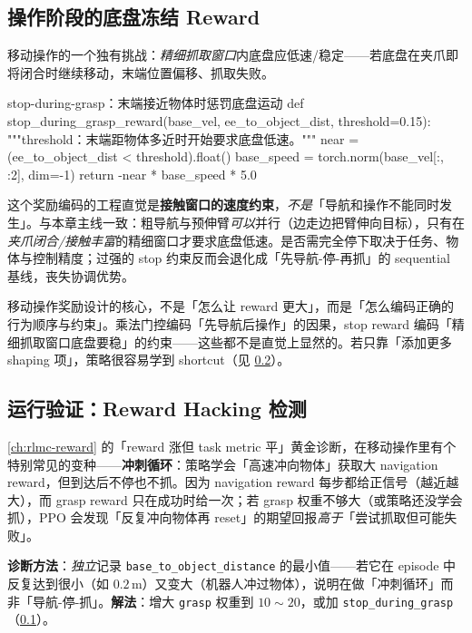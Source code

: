 \subsection{操作阶段的底盘冻结 Reward}
\label{sec:rlmc-lm-reward-stop}

移动操作的一个独有挑战：\emph{精细抓取窗口}内底盘应低速/稳定——若底盘在夹爪即将闭合时继续移动，末端位置偏移、抓取失败。

\begin{codebox}[Python]{stop-during-grasp：末端接近物体时惩罚底盘运动}
def stop_during_grasp_reward(base_vel, ee_to_object_dist, threshold=0.15):
    """threshold：末端距物体多近时开始要求底盘低速。"""
    near = (ee_to_object_dist < threshold).float()
    base_speed = torch.norm(base_vel[:, :2], dim=-1)
    return -near * base_speed * 5.0
\end{codebox}

这个奖励编码的工程直觉是\textbf{接触窗口的速度约束}，\emph{不是}「导航和操作不能同时发生」。与本章主线一致：粗导航与预伸臂\emph{可以}并行（边走边把臂伸向目标），只有在\emph{夹爪闭合/接触丰富}的精细窗口才要求底盘低速。是否需完全停下取决于任务、物体与控制精度；过强的 stop 约束反而会退化成「先导航-停-再抓」的 sequential 基线，丧失协调优势。

\begin{insight}\label{ins:rlmc-lm-reward-order}
移动操作奖励设计的核心，不是「怎么让 reward 更大」，而是「怎么编码正确的行为顺序与约束」。乘法门控编码「先导航后操作」的因果，stop reward 编码「精细抓取窗口底盘要稳」的约束——这些都不是直觉上显然的。若只靠「添加更多 shaping 项」，策略很容易学到 shortcut（见 \cref{sec:rlmc-lm-reward-hack}）。
\end{insight}

\subsection{运行验证：Reward Hacking 检测}
\label{sec:rlmc-lm-reward-hack}

\cref{ch:rlmc-reward} 的「reward 涨但 task metric 平」黄金诊断，在移动操作里有个特别常见的变种——\textbf{冲刺循环}：策略学会「高速冲向物体」获取大 navigation reward，但到达后不停也不抓。因为 navigation reward 每步都给正信号（越近越大），而 grasp reward 只在成功时给一次；若 grasp 权重不够大（或策略还没学会抓），PPO 会发现「反复冲向物体再 reset」的期望回报\emph{高于}「尝试抓取但可能失败」。

\textbf{诊断方法}：\emph{独立}记录 \verb|base_to_object_distance| 的最小值——若它在 episode 中反复达到很小（如 $0.2\,$m）又变大（机器人冲过物体），说明在做「冲刺循环」而非「导航-停-抓」。\textbf{解法}：增大 \verb|grasp| 权重到 $10\!\sim\!20$，或加 \verb|stop_during_grasp|（\cref{sec:rlmc-lm-reward-stop}）。

